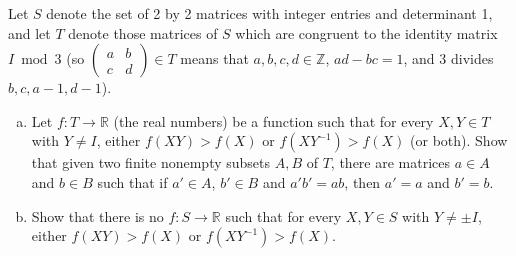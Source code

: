 Let $S$ denote the set of 2 by 2 matrices with integer entries and determinant
1, and let $T$ denote those matrices of $S$ which are congruent to the identity
matrix $I \bmod 3$ (so $\begin{pmatrix} a & b \\ c & d \end{pmatrix} \in T$
means that $a, b, c, d \in \mathbb{Z}$, $ad - bc = 1$, and 3 divides $b, c, a -
1, d - 1$).

\begin{enumerate}[(a)]

\item Let $f : T \to \mathbb{R}$ (the real numbers) be a function such that for
      every $X, Y \in T$ with $Y \ne I$, either $f(XY) > f(X)$ or $f (XY^{-1}) >
      f(X)$ (or both). Show that given two finite nonempty subsets $A, B$ of
      $T$, there are matrices $a \in A$ and $b \in B$ such that if $a' \in A$,
      $b' \in B$ and $a' b' = ab$, then $a' = a$ and $b' = b$.

\item Show that there is no $f : S \to \mathbb{R}$ such that for every $X, Y
      \in S$ with $Y \ne \pm I$, either $f (XY) > f (X)$ or $f(XY^{-1}) > f(X)$.

\end{enumerate}
